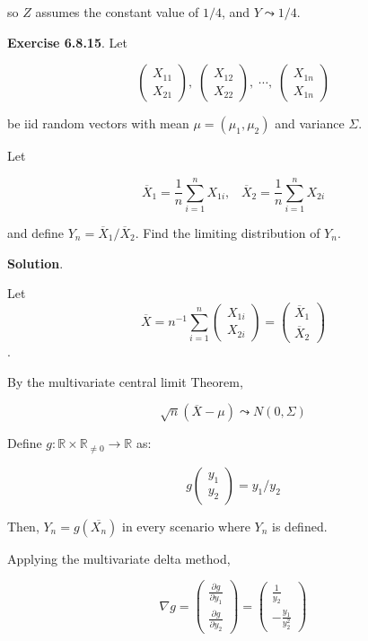 so \(Z\) assumes the constant value of \(1/4\), and \(Y \leadsto 1/4\).

\textbf{Exercise 6.8.15}. Let

\[ 
\begin{pmatrix} X_{11} \\ X_{21} \end{pmatrix}, \;
\begin{pmatrix} X_{12} \\ X_{22} \end{pmatrix}, \;
\cdots, \;
\begin{pmatrix} X_{1n} \\ X_{1n} \end{pmatrix}
\]

be iid random vectors with mean \(\mu = (\mu_{1}, \mu_{2})\) and variance
\(\Sigma\).

Let

\[
\overline{X}_{1} = \frac{1}{n}\sum_{i=1}^{n} X_{1i}, \; \; \;
\overline{X}_{2} = \frac{1}{n}\sum_{i=1}^{n} X_{2i}
\]

and define \(Y_{n} = \overline{X}_{1} \big/ \overline{X}_{2}\). Find the
limiting distribution of \(Y_{n}\).

\textbf{Solution}.

Let
\[\overline{X} = n^{-1} \sum_{i=1}^{n} \begin{pmatrix} X_{1i} \\ X_{2i} \end{pmatrix} = \begin{pmatrix} \overline{X}_{1} \\ \overline{X}_{2} \end{pmatrix}\].

By the multivariate central limit Theorem,

\[
\sqrt{n}(\overline{X} - \mu) \leadsto N(0, \Sigma)
\]

Define
\(g: \mathbb{R} \times \mathbb{R}_{\neq 0} \rightarrow \mathbb{R}\) as:

\[
g \begin{pmatrix} y_{1} \\ y_{2} \end{pmatrix} = y_{1} / y_{2}
\]

Then, \(Y_{n} = g(\overline{X_{n}})\) in every scenario where \(Y_{n}\) is
defined.

Applying the multivariate delta method,

\[ \nabla g 
= \begin{pmatrix} \frac{\partial g}{\partial y_{1}} \\ \frac{\partial g}{\partial y_{2}} \end{pmatrix} 
= \begin{pmatrix} \frac{1}{y_{2}} \\ -\frac{y_{1}}{y_{2}^{2}} \end{pmatrix} 
\]

